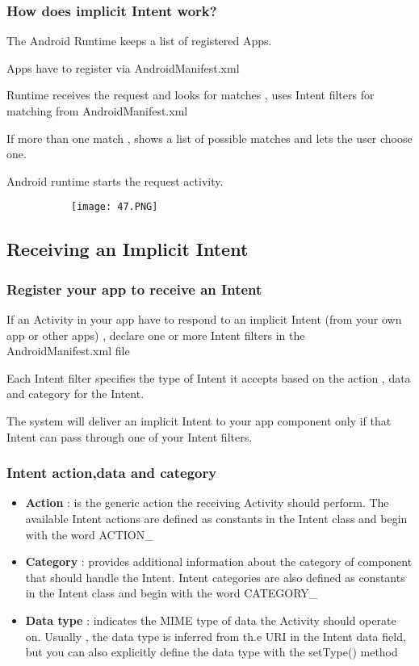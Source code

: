 \documentclass{article}
\begin{document}
\subsubsection{How does implicit Intent work?}

The Android Runtime keeps a list of registered Apps.

Apps have to register via AndroidManifest.xml

Runtime receives the request and looks for matches , uses Intent filters for matching from AndroidManifest.xml

If more than one match , shows a list of possible matches and lets the user choose one.

Android runtime starts the request activity.

  \begin{figure}[ht!]
  \centering
  \begin{subfigure}[b]{0.6\linewidth}
    \texttt{[image: 47.PNG]}
  \end{subfigure}
  \end{figure}

  \subsection{Receiving an Implicit Intent}

  \subsubsection{Register your app to receive an Intent}

  If an Activity in your app have to respond to an implicit Intent (from your own app or other apps) , declare one or more Intent filters in the AndroidManifest.xml file

  Each Intent filter specifies the type of Intent it accepts based on the action , data and category for the Intent.

  The system will deliver an implicit Intent to your app component only if that Intent can pass through one of your Intent filters.

  \subsubsection{Intent action,data and category}

  \begin{itemize}
      \item \textbf{Action} : is the generic action the receiving Activity should perform. The available Intent actions are defined as constants in the Intent class and begin with the word ACTION\_
      \item \textbf{Category} : provides additional information about the category of component that should handle the Intent. Intent categories are also defined as constants in the Intent class and begin with the word CATEGORY\_
      \item \textbf{Data type} : indicates the MIME type of data the Activity should operate on. Usually , the data type is inferred from th.e URI in the Intent data field, but you can also explicitly define the data type with the setType() method
  \end{itemize}
\end{document}
